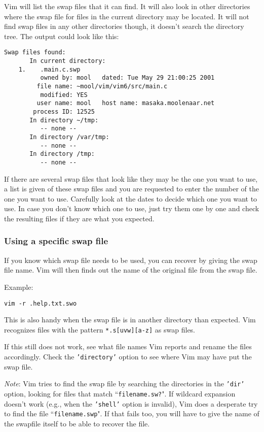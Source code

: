 Vim will list the swap files that it can find.
It will also look in other directories where the swap file for files in the current directory may be located.
It will not find swap files in any other directories though, it doesn't search the directory tree.
The output could look like this:

\begin{Verbatim}[samepage=true]
    Swap files found:
       In current directory:
    1.    .main.c.swp
          owned by: mool   dated: Tue May 29 21:00:25 2001
         file name: ~mool/vim/vim6/src/main.c
          modified: YES
         user name: mool   host name: masaka.moolenaar.net
        process ID: 12525
       In directory ~/tmp:
          -- none --
       In directory /var/tmp:
          -- none --
       In directory /tmp:
          -- none --
\end{Verbatim}

If there are several swap files that look like they may be the one you want to use, a list is given of these swap files and you are requested to enter the number of the one you want to use.
Carefully look at the dates to decide which one you want to use.
In case you don't know which one to use, just try them one by one and check the resulting files if they are what you expected.

\subsubsection{Using a specific swap file}
If you know which swap file needs to be used, you can recover by giving the swap file name.
Vim will then finds out the name of the original file from the swap file.

Example:
\begin{Verbatim}[samepage=true]
 vim -r .help.txt.swo
\end{Verbatim}

This is also handy when the swap file is in another directory than expected.
Vim recognizes files with the pattern \texttt{*.s[uvw][a-z]} as swap files.

If this still does not work, see what file names Vim reports and rename the files accordingly.
Check the \texttt{'directory'} option to see where Vim may have put the swap file.

\emph{Note}: Vim tries to find the swap file by searching the directories in the \texttt{'dir'} option, looking for files that match ``\texttt{filename.sw?}".
If wildcard expansion doesn't work (e.g., when the \texttt{'shell'} option is invalid), Vim does a desperate try to find the file ``\texttt{filename.swp}".
If that fails too, you will have to give the name of the swapfile itself to be able to recover the file.
